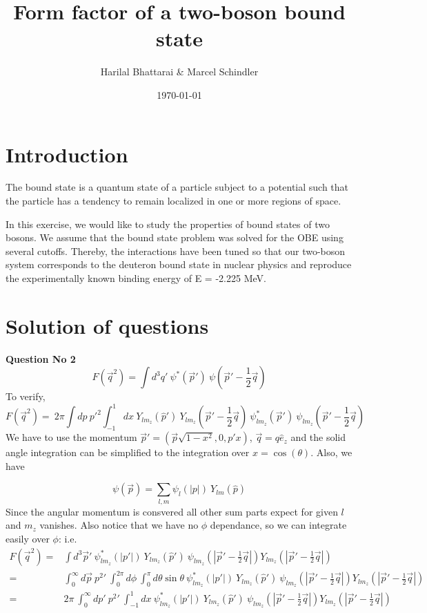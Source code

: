 \documentclass[11pt, a4paper, DIV=12]{scrartcl}
\title{Form factor of a two-boson bound state}
\date{\today}
\author{Harilal Bhattarai \& Marcel Schindler}
\begin{document}
	\maketitle
	
\section{Introduction}
The  bound state is a quantum state of a particle subject to a potential such that the particle has a tendency to remain localized in one or more regions of space. 

In this exercise, we would like to study the properties of bound states of two bosons. We assume that the bound state problem was solved for the OBE using several cutoffs. Thereby, the interactions have been tuned so that our two-boson system corresponds to the deuteron bound state in nuclear physics and reproduce the experimentally known binding energy of E = -2.225 MeV.

\section{Solution of questions}
\textbf{Question No 2}
\begin{equation}
F(\vec{q}^2)=\int d^3 q\prime ~\psi ^* (\vec{p}\prime) ~\psi(\vec{p}\prime - \frac{1}{2}\vec{q})
\label{Equ:QN1}
\end{equation}
To verify,
\begin{equation}
F(\vec{q}^2)= ~ 2\pi\int dp ~p\prime ^2 \int_{-1}^{1} dx ~ Y_{lm_{z}}(\hat{p}\prime) ~ Y_{lm_{z}}(\vec{p}\prime - \frac{1}{2}\vec{q})  ~\psi^{*}_{lm_{z}} (\vec{p}\prime) ~\psi_{lm_{z}}(\vec{p}\prime - \frac{1}{2}\vec{q})
\label{Equ:QN2}
\end{equation}
We have to use the momentum $ \vec{p}\prime = (\vec{p}\sqrt{1-x^2}, 0, p\prime x)$, $ \vec{q}=q \hat{e}_{z}$ and the solid angle integration can be simplified to the integration over $ x= \cos(\theta) $. Also, we have

\begin{equation}
	\psi(\vec{p})= \sum_{l, m} \psi_{l}(|p|) ~ Y_{lm}(\hat{p})
\end{equation}
Since the angular momentum is consvered all other sum parts expect for given $l$ and $m_z$ vanishes. Also notice that we have no $\phi$ dependance, so we can integrate easily over $\phi$:
i.e.
\begin{align}
F(\vec{q}^2)=& \int d^{3}\vec{p}\prime~\psi^{*}_{lm_{z}} (|p\prime|) ~ Y_{lm_{z}}(\hat{p}\prime) ~\psi_{lm_{z}}(|\vec{p}\prime - \frac{1}{2}\vec{q}|) Y_{lm_{z}}(|\vec{p}\prime - \frac{1}{2}\vec{q}|)\\
=& \int_{0}^{\infty} d\vec{p} ~ p^{2}\prime ~ \int_{0}^{2 \pi} d\phi ~ \int_{0}^{\pi} d\theta \sin\theta ~\psi^{*}_{lm_{z}} (|p\prime|) ~ Y_{lm_{z}}(\hat{p}\prime) ~\psi_{lm_{z}}(|\vec{p}\prime - \frac{1}{2}\vec{q}|) Y_{lm_{z}}(|\vec{p}\prime - \frac{1}{2}\vec{q}|)\\
=& 2\pi ~\int_{0}^{\infty} dp\prime ~ p^{2}\prime ~\int_{-1}^{1}d x~\psi^{*}_{lm_{z}} (|p\prime|) ~ Y_{lm_{z}}(\hat{p}\prime) ~\psi_{lm_{z}}(|\vec{p}\prime - \frac{1}{2}\vec{q}|) Y_{lm_{z}}(|\vec{p}\prime - \frac{1}{2}\vec{q}|)
\end{align}
\end{document}
